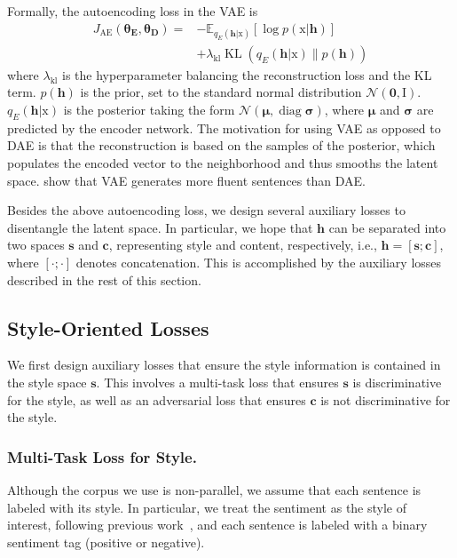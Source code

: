 \documentclass[letterpaper]{article} %
\newcommand{\rmx}{\mathrm x}
\newcommand{\loss}[1]{J_{\text{#1}}}
\newcommand{\hyp}[1]{\lambda_{\text{#1}}}
\newcommand{\nnweight}[1]{\bm{\theta_{\text{#1}}}}
\newcommand{\citeay}[1]{\citeauthor{#1} \shortcite{#1}}
\begin{document}
Formally, the autoencoding loss in the VAE is
\begin{align}
	\loss{AE}(\nnweight{E}, \nnweight{D}) = & - \mathbb{E}_{q_{E}(\bm h|\rmx)} [\log p(\rmx|\bm h)]  \nonumber \\
	                                        & + \hyp{kl}\operatorname{KL}(q_{E}(\bm h|\rmx)\|p(\bm h))
\end{align}
where $\hyp{kl}$ is the hyperparameter balancing the reconstruction loss and the KL term. $p(\bm h)$ is the prior, set to the standard normal distribution $\mathcal{N}(\bm 0,\mathrm I)$. $q_E(\bm h|\mathrm x)$ is the posterior taking the form $\mathcal{N}(\bm \mu,\operatorname{diag} \bm\sigma)$, where $\bm\mu$ and $\bm\sigma$ are predicted by the encoder network.
The motivation for using VAE as opposed to DAE is  that the reconstruction is based on the samples of the posterior, which populates the encoded vector to the neighborhood and thus smooths the latent space. \citeay{bowman2016generating} show that VAE generates more fluent sentences than DAE. 

Besides the above autoencoding loss, we design several auxiliary losses to disentangle the latent space. In particular, we hope that $\bm h$ can be separated into two spaces $\bm s$ and $\bm c$, representing style and content, respectively, i.e., $\bm h = [\bm s ; \bm c]$, where $[\cdot;\cdot]$ denotes concatenation.
This is accomplished by the auxiliary losses described in the rest of this section.


\subsection{Style-Oriented Losses}

We first design auxiliary losses that ensure the style information is contained in the style space $\bm s$.
This involves a multi-task loss that ensures $\bm s$ is discriminative for the style, as well as an adversarial loss that ensures $\bm c$ is not discriminative for the style.

\subsubsection{Multi-Task Loss for Style.} \label{ssec:multitask-style-objective}
Although the corpus we use is non-parallel, we assume that each sentence is labeled with its style. In particular, we treat the sentiment as the style of interest, following previous work~\cite{hu2017toward,shen2017style,fu2018style,zhao2018adversarially}, and each sentence is labeled with a binary sentiment tag (positive or negative).
\end{document}

